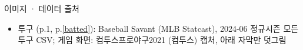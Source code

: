 \documentclass[aspectratio=169,11pt,t]{beamer}
\begin{document}
\begin{frame}{이미지 · 데이터 출처}
\vfill
\small
\begin{itemize}
\item 투구 (p.1, p.\ref{batted}): Baseball Savant (MLB Statcast), 2024-06 정규시즌 모든 투구 CSV; 게임 화면: 컴투스프로야구2021 (컴투스) 캡처, 아래 자막만 덧그림
\end{itemize}
\vfill
{}
\end{frame}
\end{document}
